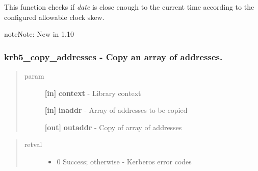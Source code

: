 \documentclass[letterpaper,10pt,english]{sphinxmanual}
\begin{document}
This function checks if \emph{date} is close enough to the current time according to the configured allowable clock skew.

\begin{notice}{note}{Note:}
New in 1.10
\end{notice}


\subsubsection{krb5\_copy\_addresses -  Copy an array of addresses.}
\label{appdev/refs/api/krb5_copy_addresses:krb5-copy-addresses-copy-an-array-of-addresses}\label{appdev/refs/api/krb5_copy_addresses::doc}

\begin{fulllineitems}
\label{appdev/refs/api/krb5_copy_addresses:c.krb5_copy_addresses}
\end{fulllineitems}

\begin{quote}\begin{description}
\item[{param}] \leavevmode
\textbf{{[}in{]}} \textbf{context} - Library context

\textbf{{[}in{]}} \textbf{inaddr} - Array of addresses to be copied

\textbf{{[}out{]}} \textbf{outaddr} - Copy of array of addresses

\end{description}\end{quote}
\begin{quote}\begin{description}
\item[{retval}] \leavevmode\begin{itemize}
\item {} 
0   Success; otherwise - Kerberos error codes

\end{itemize}

\end{description}\end{quote}
\end{document}
